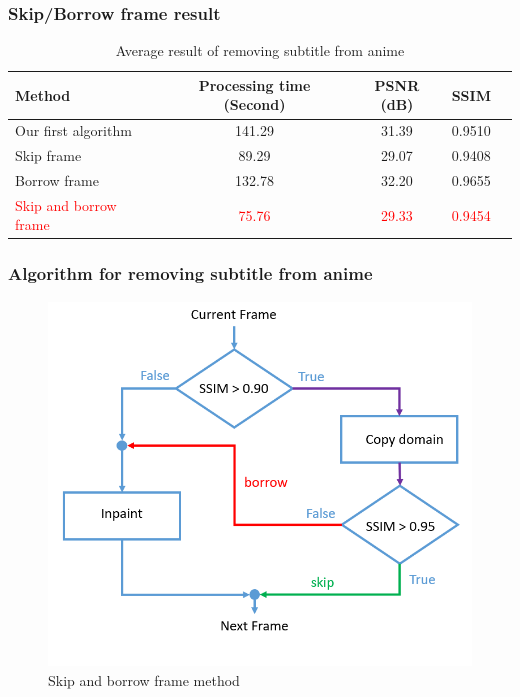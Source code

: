 \documentclass[xcolor=dvipsnames, xetex,serif]{beamer}
\begin{document}
    \begin{frame}
        \frametitle{Skip/Borrow frame result}
        \begin{table}[H]
            \centering
            
            \begin{tabular}[ht]{|l|c|c|c|c|}
                \hline
                Method  & Processing time  (Second) & PSNR (dB) & SSIM \\
                \hline
                Our first algorithm & 141.29 & 31.39  &  0.9510\\
                Skip frame & 89.29 & 29.07 & 0.9408 \\
                Borrow frame & 132.78 & 32.20 & 0.9655\\
                \textcolor{red}{Skip and borrow frame} & \textcolor{red}{75.76} & \textcolor{red}{29.33} & \textcolor{red}{0.9454} \\
                \hline
            \end{tabular}
            \caption{Average result of removing subtitle from anime}
        \end{table}	
    \end{frame}
    \begin{frame}
        \frametitle{Algorithm for removing subtitle from anime}  
        \begin{figure}[H]
            \centering
            \includegraphics[width=0.6\linewidth]{images/skipborrow/flowchart-skipandborrow.png}
            \caption{Skip and borrow frame method}
        \end{figure}        
    \end{frame}
\end{document}
